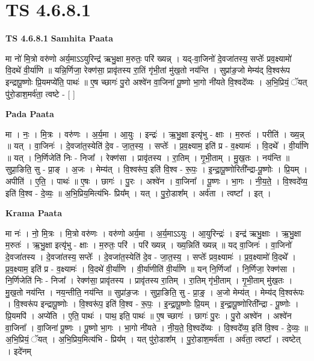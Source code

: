 \documentclass[17pt]{extarticle}
\begin{document}
\section{ TS 4.6.8.1 }

\textbf{TS 4.6.8.1 } \newline
\textbf{Samhita Paata} \newline

मा नो॑ मि॒त्रो वरु॑णो अर्य॒माऽऽयुरिन्द्र॑ ऋभु॒क्षा म॒रुतः॒ परि॑ ख्यन्न् । यद्-वा॒जिनो॑ दे॒वजा॑तस्य॒ सप्तेः᳚ प्रव॒क्ष्यामो॑ वि॒दथे॑ वी॒र्या॑णि ॥ यन्नि॒र्णिजा॒ रेक्ण॑सा॒ प्रावृ॑तस्य रा॒तिं गृ॑भी॒तां मु॑ख॒तो नय॑न्ति । सुप्रा॑ङ॒जो मेम्य॑द् वि॒श्वरू॑प इन्द्रापू॒ष्णोः प्रि॒यमप्ये॑ति॒ पाथः॑ ॥ ए॒ष च्छागः॑ पु॒रो अश्वे॑न वा॒जिना॑ पू॒ष्णो भा॒गो नी॑यते वि॒श्वदे᳚व्यः । अ॒भि॒प्रियं॒ ॅयत् पु॑रो॒डाश॒मर्व॑ता॒ त्वष्टे - [  ] \newline

\textbf{Pada Paata} \newline

मा । नः॒ । मि॒त्रः । वरु॑णः । अ॒र्य॒मा । आ॒युः । इन्द्रः॑ । ऋ॒भु॒क्षा इत्यृ॑भु - क्षाः । म॒रुतः॑ । परीति॑ । ख्य॒न्न् ॥ यत् । वा॒जिनः॑ । दे॒वजा॑त॒स्येति॑ दे॒व - जा॒त॒स्य॒ । सप्तेः᳚ । प्र॒व॒क्ष्याम॒ इति॑ प्र - व॒क्ष्यामः॑ । वि॒दथे᳚ । वी॒र्या॑णि ॥ यत् । नि॒र्णिजेति॑ निः - निजा᳚ । रेक्ण॑सा । प्रावृ॑तस्य । रा॒तिम् । गृ॒भी॒ताम् । मु॒ख॒तः । नय॑न्ति ॥ सुप्रा॒ङिति॒ सु - प्रा॒ङ् । अ॒जः । मेम्य॑त् । वि॒श्वरू॑प॒ इति॑ वि॒श्व - रू॒पः॒ । इ॒न्द्रा॒पू॒ष्णोरिती᳚न्द्रा-पू॒ष्णोः । प्रि॒यम् । अपीति॑ । ए॒ति॒ । पाथः॑ ॥ ए॒षः । छागः॑ । पु॒रः । अश्वे॑न । वा॒जिना᳚ । पू॒ष्णः । भा॒गः । नी॒य॒ते॒ । वि॒श्वदे᳚व्य॒ इति॑ वि॒श्व - दे॒व्यः॒ ॥ अ॒भि॒प्रिय॒मित्य॑भि- प्रिय᳚म् । यत् । पु॒रो॒डाश᳚म् । अर्व॑ता । त्वष्टा᳚ । इत् ।  \newline


\textbf{Krama Paata} \newline

मा नः॑ । नो॒ मि॒त्रः । मि॒त्रो वरु॑णः । वरु॑णो अर्य॒मा । अ॒र्य॒माऽऽयुः । आ॒युरिन्द्रः॑ । इन्द्र॑ ऋभु॒क्षाः । ऋ॒भु॒क्षा म॒रुतः॑ । ऋ॒भु॒क्षा इत्यृ॑भु - क्षाः । म॒रुतः॒ परि॑ । परि॑ ख्यन्न् । ख्य॒न्निति॑ ख्यन्न् ॥ यद् वा॒जिनः॑ । वा॒जिनो॑ दे॒वजा॑तस्य । दे॒वजा॑तस्य॒ सप्तेः᳚ । दे॒वजा॑त॒स्येति॑ दे॒व - जा॒त॒स्य॒ । सप्तेः᳚ प्रव॒क्ष्यामः॑ । प्र॒व॒क्ष्यामो॑ वि॒दथे᳚ । प्र॒व॒क्ष्याम॒ इति॑ प्र - व॒क्ष्यामः॑ । वि॒दथे॑ वी॒र्या॑णि । वी॒र्या॑णीति॑ वी॒र्या॑णि ॥ यन् नि॒र्णिजा᳚ । नि॒र्णिजा॒ रेक्ण॑सा । नि॒र्णिजेति॑ निः - निजा᳚ । रेक्ण॑सा॒ प्रावृ॑तस्य । प्रावृ॑तस्य रा॒तिम् । रा॒तिम् गृ॑भी॒ताम् । गृ॒भी॒ताम् मु॑ख॒तः । मु॒ख॒तो नय॑न्ति । नय॒न्तीति॒ नय॑न्ति ॥ सुप्रा॑ङ॒जः । सुप्रा॒ङिति॒ सु - प्रा॒ङ्॒ । अ॒जो मेम्य॑त् । मेम्य॑द् वि॒श्वरू॑पः । वि॒श्वरू॑प इन्द्रापू॒ष्णोः । वि॒श्वरू॑प॒ इति॑ वि॒श्व - रू॒पः॒ । इ॒न्द्रा॒पू॒ष्णोः प्रि॒यम् । इ॒न्द्रा॒पू॒ष्णोरिती᳚न्द्रा - पू॒ष्णोः । प्रि॒यमपि॑ । अप्ये॑ति । ए॒ति॒ पाथः॑ । पाथ॒ इति॒ पाथः॑ ॥ ए॒ष च्छागः॑ । छागः॑ पु॒रः । पु॒रो अश्वे॑न । अश्वे॑न वा॒जिना᳚ । वा॒जिना॑ पू॒ष्णः । पू॒ष्णो भा॒गः । भा॒गो नी॑यते । नी॒य॒ते॒ वि॒श्वदे᳚व्यः । वि॒श्वदे᳚व्य॒ इति॑ वि॒श्व - दे॒व्यः॒ ॥ अ॒भि॒प्रियं॒ ॅयत् । अ॒भि॒प्रिय॒मित्य॑भि - प्रिय᳚म् । यत् पु॑रो॒डाश᳚म् । पु॒रो॒डाश॒मर्व॑ता । अर्व॑ता॒ त्वष्टा᳚ । त्वष्टेत् । इदे॑नम् \newline
\end{document}
